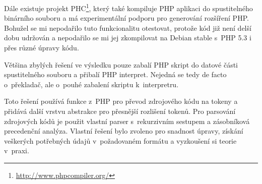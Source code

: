 \documentclass[czech]{ExcelAtFIT}
\begin{document}

		Dále existuje projekt PHC\footnote{\url{http://www.phpcompiler.org/}}, který také kompiluje PHP aplikaci do spustitelného binárního souboru a má experimentální podporu pro generování rozšíření PHP. Bohužel se mi nepodařilo tuto funkcionalitu otestovat, protože kód již není delší dobu udržován a nepodařilo se mi jej zkompilovat na Debian stable s~PHP 5.3 i přes různé úpravy kódu.


		Většina zbylých řešení ve výsledku pouze zabalí PHP skript do datové části spustitelného souboru a přibalí PHP interpret. Nejedná se tedy de facto o~překladač, ale o~pouhé zabalení skriptu k~interpretru.



		Toto řešení používá funkce z~PHP pro převod zdrojového kódu na tokeny a přidává další vrstvu abstrakce pro přesnější rozlišení tokenů. Pro parsování zdrojových kódů je použit vlastní parser s~rekurzivním sestupem a zásobníková precedenční analýza. Vlastní řešení bylo zvoleno pro snadnost úpravy, získání veškerých potřebných údajů v~požadovaném formátu a vyzkoušení si teorie v~praxi.
\end{document}
